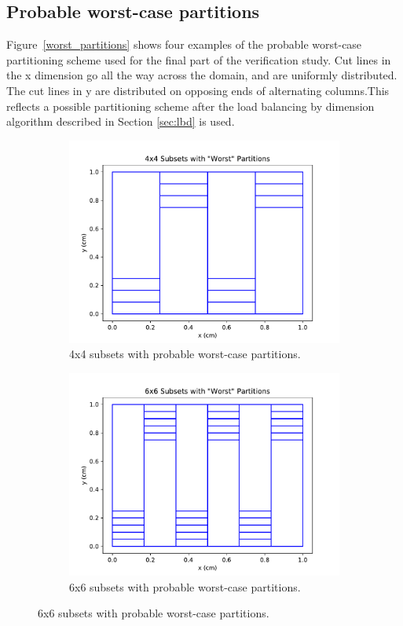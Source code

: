 \subsection{Probable worst-case partitions}
Figure~\ref{worst_partitions} shows four examples of the probable worst-case partitioning scheme used for the final part of the verification study. Cut lines in the x dimension go all the way across the domain, and are uniformly distributed. The cut lines in y are distributed on opposing ends of alternating columns.This reflects a possible partitioning scheme after the load balancing by dimension algorithm described in Section \ref{sec:lbd} is used.
\begin{figure}[H]
\centering
\begin{subfigure}[b]{0.45\textwidth}
  \includegraphics[width=\textwidth]{../cut_line_files/4_worst.pdf}
  \caption{4x4 subsets with probable worst-case partitions.}
  \label{4worst}
\end{subfigure}
\begin{subfigure}[b]{0.45\textwidth}
  \includegraphics[width=\textwidth]{../cut_line_files/6_worst.pdf}
  \caption{6x6 subsets with probable worst-case partitions.}
  \label{6worst}
\end{subfigure}


\end{figure}
